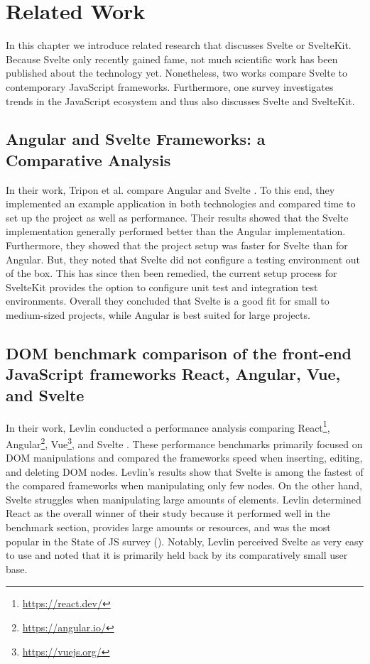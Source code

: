 \chapter{Related Work}
\label{ch:related-work}

In this chapter we introduce related research that discusses Svelte or SvelteKit. Because Svelte only recently gained fame, not much scientific work has been published about the technology yet. Nonetheless, two works compare Svelte to contemporary JavaScript frameworks. Furthermore, one survey investigates trends in the JavaScript ecosystem and thus also discusses Svelte and SvelteKit.

\section{Angular and Svelte Frameworks: a Comparative Analysis}
In their work, Tripon et al. compare Angular and Svelte \cite{tripon_angular_2021}. To this end, they implemented an example application in both technologies and compared time to set up the project as well as performance. Their results showed that the Svelte implementation generally performed better than the Angular implementation. Furthermore, they showed that the project setup was faster for Svelte than for Angular. But, they noted that Svelte did not configure a testing environment out of the box. This has since then been remedied, the current setup process for SvelteKit provides the option to configure unit test and integration test environments. Overall they concluded that Svelte is a good fit for small to medium-sized projects, while Angular is best suited for large projects.  

\section{DOM benchmark comparison of the front-end JavaScript frameworks React, Angular, Vue, and Svelte}
In their work, Levlin conducted a performance analysis comparing React\footnote{\url{https://react.dev/}}, Angular\footnote{\url{https://angular.io/}}, Vue\footnote{\url{https://vuejs.org/}}, and Svelte \cite{levlin_dom_2020}. These performance benchmarks primarily focused on DOM manipulations and compared the frameworks speed when inserting, editing, and deleting DOM nodes. Levlin's results show that Svelte is among the fastest of the compared frameworks when manipulating only few nodes. On the other hand, Svelte struggles when manipulating large amounts of elements. Levlin determined React as the overall winner of their study because it performed well in the benchmark section, provides large amounts or resources, and was the most popular in the State of JS survey (). Notably, Levlin perceived Svelte as very easy to use and noted that it is primarily held back by its comparatively small user base.   


